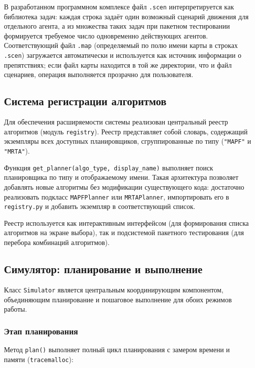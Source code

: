 В разработанном программном комплексе файл \texttt{.scen} интерпретируется как библиотека задач: каждая строка задаёт один возможный сценарий движения для отдельного агента, а из множества таких задач при пакетном тестировании формируется требуемое число одновременно действующих агентов. Соответствующий файл \texttt{.map} (определяемый по полю имени карты в строках \texttt{.scen}) загружается автоматически и используется как источник информации о препятствиях; если файл карты находится в той же директории, что и файл сценариев, операция выполняется прозрачно для пользователя.

\subsection{Система регистрации алгоритмов}

Для обеспечения расширяемости системы реализован центральный реестр алгоритмов (модуль \texttt{registry}). Реестр представляет собой словарь, содержащий экземпляры всех доступных планировщиков, сгруппированные по типу (\texttt{"MAPF"} и \texttt{"MRTA"}).

Функция \texttt{get\_planner(algo\_type, display\_name)} выполняет поиск планировщика по типу и отображаемому имени. Такая архитектура позволяет добавлять новые алгоритмы без модификации существующего кода: достаточно реализовать подкласс \texttt{MAPFPlanner} или \texttt{MRTAPlanner}, импортировать его в \texttt{registry.py} и добавить экземпляр в соответствующий список.

Реестр используется как интерактивным интерфейсом (для формирования списка алгоритмов на экране выбора), так и подсистемой пакетного тестирования (для перебора комбинаций алгоритмов).

\subsection{Симулятор: планирование и выполнение}

Класс \texttt{Simulator} является центральным координирующим компонентом, объединяющим планирование и пошаговое выполнение для обоих режимов работы.

\subsubsection{Этап планирования}

Метод \texttt{plan()} выполняет полный цикл планирования с замером времени и памяти (\texttt{tracemalloc}):

